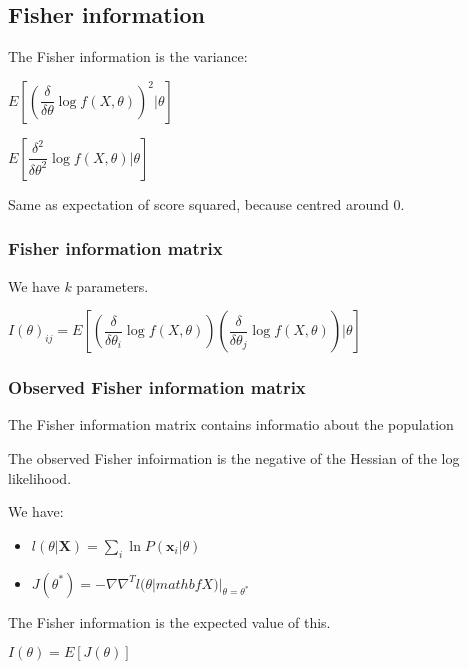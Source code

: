 
\subsection{Fisher information}

The Fisher information is the variance:

\(E[(\dfrac{\delta }{\delta \theta }\log f(X, \theta ))^2 |\theta ]\)

\(E[\dfrac{\delta^2 }{\delta \theta^2 }\log f(X, \theta ) |\theta ]\)

Same as expectation of score squared, because centred around \(0\).

\subsubsection{Fisher information matrix}

We have \(k\) parameters.

\(I(\theta )_{ij}=E[(\dfrac{\delta }{\delta \theta_i}\log f(X, \theta ))(\dfrac{\delta }{\delta \theta_j }\log f(X, \theta ))|\theta ]\)

\subsubsection{Observed Fisher information matrix}

The Fisher information matrix contains informatio about the population

The observed Fisher infoirmation is the negative of the Hessian of the log likelihood.

We have:

\begin{itemize}
\item \(l(\theta |\mathbf X)=\sum_i\ln P(\mathbf x_i|\theta )\)
\item \(J(\theta^*)=-\nabla \nabla^Tl(\theta|mathbf X )|_{\theta = \theta^*}\)
\end{itemize}

The Fisher information is the expected value of this.

\(I(\theta )=E[J(\theta)]\)


